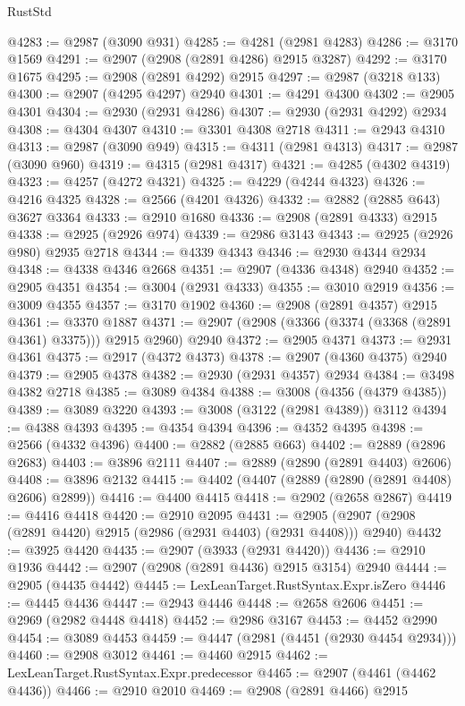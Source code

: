 \begin{lexlean}{RustStd}
\begin{coremodule}
@4283 := @2987 (@3090 @931)
@4285 := @4281 (@2981 @4283)
@4286 := @3170 @1569
@4291 := @2907 (@2908 (@2891 @4286) @2915 @3287)
@4292 := @3170 @1675
@4295 := @2908 (@2891 @4292) @2915
@4297 := @2987 (@3218 @133)
@4300 := @2907 (@4295 @4297) @2940
@4301 := @4291 @4300
@4302 := @2905 @4301
@4304 := @2930 (@2931 @4286)
@4307 := @2930 (@2931 @4292) @2934
@4308 := @4304 @4307
@4310 := @3301 @4308 @2718
@4311 := @2943 @4310
@4313 := @2987 (@3090 @949)
@4315 := @4311 (@2981 @4313)
@4317 := @2987 (@3090 @960)
@4319 := @4315 (@2981 @4317)
@4321 := @4285 (@4302 @4319)
@4323 := @4257 (@4272 @4321)
@4325 := @4229 (@4244 @4323)
@4326 := @4216 @4325
@4328 := @2566 (@4201 @4326)
@4332 := @2882 (@2885 @643) @3627 @3364
@4333 := @2910 @1680
@4336 := @2908 (@2891 @4333) @2915
@4338 := @2925 (@2926 @974)
@4339 := @2986 @3143
@4343 := @2925 (@2926 @980) @2935 @2718
@4344 := @4339 @4343
@4346 := @2930 @4344 @2934
@4348 := @4338 @4346 @2668
@4351 := @2907 (@4336 @4348) @2940
@4352 := @2905 @4351
@4354 := @3004 (@2931 @4333)
@4355 := @3010 @2919
@4356 := @3009 @4355
@4357 := @3170 @1902
@4360 := @2908 (@2891 @4357) @2915
@4361 := @3370 @1887
@4371 := @2907 (@2908 (@3366 (@3374 (@3368 (@2891 @4361) @3375))) @2915 @2960) @2940
@4372 := @2905 @4371
@4373 := @2931 @4361
@4375 := @2917 (@4372 @4373)
@4378 := @2907 (@4360 @4375) @2940
@4379 := @2905 @4378
@4382 := @2930 (@2931 @4357) @2934
@4384 := @3498 @4382 @2718
@4385 := @3089 @4384
@4388 := @3008 (@4356 (@4379 @4385))
@4389 := @3089 @3220
@4393 := @3008 (@3122 (@2981 @4389)) @3112
@4394 := @4388 @4393
@4395 := @4354 @4394
@4396 := @4352 @4395
@4398 := @2566 (@4332 @4396)
@4400 := @2882 (@2885 @663)
@4402 := @2889 (@2896 @2683)
@4403 := @3896 @2111
@4407 := @2889 (@2890 (@2891 @4403) @2606)
@4408 := @3896 @2132
@4415 := @4402 (@4407 (@2889 (@2890 (@2891 @4408) @2606) @2899))
@4416 := @4400 @4415
@4418 := @2902 (@2658 @2867)
@4419 := @4416 @4418
@4420 := @2910 @2095
@4431 := @2905 (@2907 (@2908 (@2891 @4420) @2915 (@2986 (@2931 @4403) (@2931 @4408))) @2940)
@4432 := @3925 @4420
@4435 := @2907 (@3933 (@2931 @4420))
@4436 := @2910 @1936
@4442 := @2907 (@2908 (@2891 @4436) @2915 @3154) @2940
@4444 := @2905 (@4435 @4442)
@4445 := LexLeanTarget.RustSyntax.Expr.isZero
@4446 := @4445 @4436
@4447 := @2943 @4446
@4448 := @2658 @2606
@4451 := @2969 (@2982 @4448 @4418)
@4452 := @2986 @3167
@4453 := @4452 @2990
@4454 := @3089 @4453
@4459 := @4447 (@2981 (@4451 (@2930 @4454 @2934)))
@4460 := @2908 @3012
@4461 := @4460 @2915
@4462 := LexLeanTarget.RustSyntax.Expr.predecessor
@4465 := @2907 (@4461 (@4462 @4436))
@4466 := @2910 @2010
@4469 := @2908 (@2891 @4466) @2915

\end{coremodule}
\end{lexlean}
